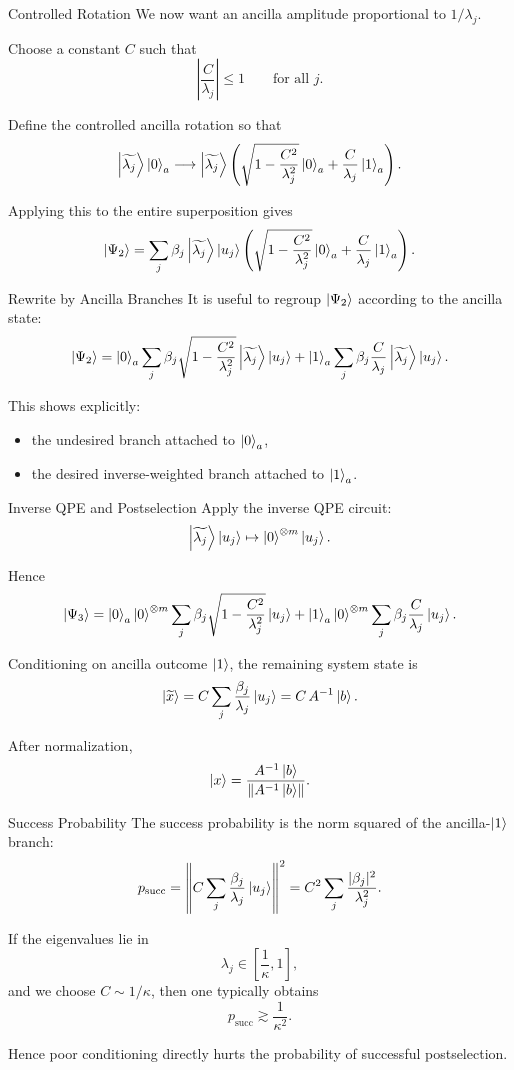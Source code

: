 \documentclass{beamer}
\begin{document}
\begin{frame}{Controlled Rotation}
We now want an ancilla amplitude proportional to \(1/\lambda_j\).

Choose a constant \(C\) such that
\[
\left|\frac{C}{\lambda_j}\right|\le 1
\qquad
\text{for all } j.
\]

Define the controlled ancilla rotation so that
\[
\ket{\widetilde{\lambda_j}}\ket{0}_{a}
\longrightarrow
\ket{\widetilde{\lambda_j}}
\left(
\sqrt{1-\frac{C^2}{\lambda_j^2}}\ket{0}_{a}
+
\frac{C}{\lambda_j}\ket{1}_{a}
\right).
\]

Applying this to the entire superposition gives
\[
\ket{\Psi_2}
=
\sum_j \beta_j
\ket{\widetilde{\lambda_j}}\ket{u_j}
\left(
\sqrt{1-\frac{C^2}{\lambda_j^2}}\ket{0}_{a}
+
\frac{C}{\lambda_j}\ket{1}_{a}
\right).
\]
\end{frame}

\begin{frame}{Rewrite by Ancilla Branches}
It is useful to regroup \(\ket{\Psi_2}\) according to the ancilla state:
\[
\ket{\Psi_2}
=
\ket{0}_{a}
\sum_j \beta_j \sqrt{1-\frac{C^2}{\lambda_j^2}}
\ket{\widetilde{\lambda_j}}\ket{u_j}
+
\ket{1}_{a}
\sum_j \beta_j \frac{C}{\lambda_j}
\ket{\widetilde{\lambda_j}}\ket{u_j}.
\]

This shows explicitly:
\begin{itemize}
    \item the undesired branch attached to \(\ket{0}_a\),
    \item the desired inverse-weighted branch attached to \(\ket{1}_a\).
\end{itemize}
\end{frame}

\begin{frame}{Inverse QPE and Postselection}
Apply the inverse QPE circuit:
\[
\ket{\widetilde{\lambda_j}}\ket{u_j}\mapsto \ket{0}^{\otimes m}\ket{u_j}.
\]

Hence
\[
\ket{\Psi_3}
=
\ket{0}_{a}\ket{0}^{\otimes m}
\sum_j \beta_j \sqrt{1-\frac{C^2}{\lambda_j^2}} \ket{u_j}
+
\ket{1}_{a}\ket{0}^{\otimes m}
\sum_j \beta_j \frac{C}{\lambda_j} \ket{u_j}.
\]

Conditioning on ancilla outcome \(\ket{1}\), the remaining system state is
\[
\ket{\widetilde{x}} = C \sum_j \frac{\beta_j}{\lambda_j}\ket{u_j}=C\,A^{-1}\ket{b}.
\]

After normalization,
\[
\ket{x}
=
\frac{A^{-1}\ket{b}}{\norm{A^{-1}\ket{b}}}.
\]
\end{frame}

\begin{frame}{Success Probability}
The success probability is the norm squared of the ancilla-\(\ket{1}\) branch:
\[
p_{\mathrm{succ}}
=
\left\| C \sum_j \frac{\beta_j}{\lambda_j}\ket{u_j}\right\|^2
=
C^2 \sum_j \frac{|\beta_j|^2}{\lambda_j^2}.
\]

If the eigenvalues lie in
\[
\lambda_j \in \left[\frac{1}{\kappa},1\right],
\]
and we choose \(C\sim 1/\kappa\), then one typically obtains
\[
p_{\mathrm{succ}} \gtrsim \frac{1}{\kappa^2}.
\]

Hence poor conditioning directly hurts the probability of successful postselection.
\end{frame}
\end{document}

